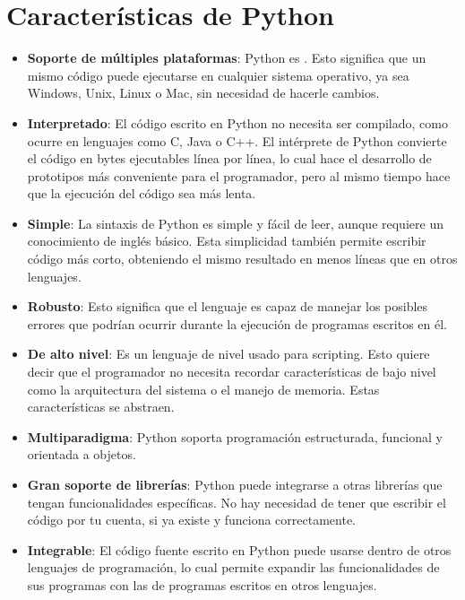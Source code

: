 \section{Características de Python}

\begin{itemize}
  \item \textbf{Soporte de múltiples plataformas}: Python es . Esto significa que un mismo código puede ejecutarse en cualquier sistema operativo, ya sea Windows, Unix, Linux o Mac, sin necesidad de hacerle cambios.
  
  \item \textbf{Interpretado}: El código escrito en Python no necesita ser compilado, como ocurre en lenguajes como C, Java o C++. El intérprete de Python convierte el código en bytes ejecutables línea por línea, lo cual hace el desarrollo de prototipos más conveniente para el programador, pero al mismo tiempo hace que la ejecución del código sea más lenta.
  
  \item \textbf{Simple}: La sintaxis de Python es simple y fácil de leer, aunque requiere un conocimiento de inglés básico. Esta simplicidad también permite escribir código más corto, obteniendo el mismo resultado en menos líneas que en otros lenguajes.
  
  \item \textbf{Robusto}: Esto significa que el lenguaje es capaz de manejar los posibles errores que podrían ocurrir durante la ejecución de programas escritos en él.
  
  \item \textbf{De alto nivel}: Es un lenguaje de nivel usado para scripting. Esto quiere decir que el programador no necesita recordar características de bajo nivel como la arquitectura del sistema o el manejo de memoria. Estas características se abstraen.
  
  \item \textbf{Multiparadigma}: Python soporta programación estructurada, funcional y orientada a objetos.

  \item \textbf{Gran soporte de librerías}: Python puede integrarse a otras librerías que tengan funcionalidades específicas. No hay necesidad de tener que escribir el código por tu cuenta, si ya existe y funciona correctamente.
  
  \item \textbf{Integrable}: El código fuente escrito en Python puede usarse dentro de otros lenguajes de programación, lo cual permite expandir las funcionalidades de sus programas con las de programas escritos en otros lenguajes.
  

\end{itemize}
